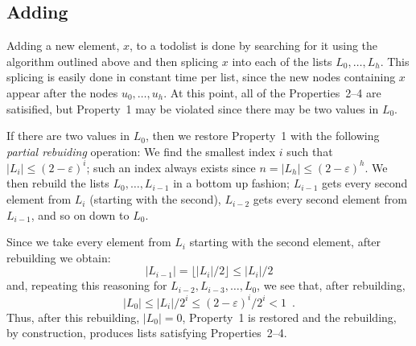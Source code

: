 \documentclass[12pt]{patmorin}
\newcommand{\eps}{\varepsilon}
\begin{document}
\vspace{1ex}
\begin{algorithmic}
    \ENDIF
  \ENDFOR
\end{algorithmic}

\subsection{Adding}

Adding a new element, $x$, to a todolist is done by searching for it
using the algorithm outlined above and then splicing $x$ into each of
the lists $L_0,\ldots,L_h$.  This splicing is easily done in constant
time per list, since the new nodes containing $x$ appear after the nodes
$u_0,\ldots,u_h$.  At this point, all of the Properties~2--4 are satisified,
but Property~1 may be violated since there may be two values in $L_0$.

If there are two values in $L_0$, then we restore Property~1 with the
following \emph{partial rebuiding} operation: We find the smallest index
$i$ such that $|L_i|\le (2-\eps)^i$; such an index always exists since
$n=|L_h|\le(2-\eps)^h$.  We then rebuild the lists $L_{0},\ldots,L_{i-1}$
in a bottom up fashion; $L_{i-1}$ gets every second element from $L_i$
(starting with the second), $L_{i-2}$ gets every second element from
$L_{i-1}$, and so on down to $L_0$.

Since we take every element from $L_i$ starting with the second element,
after rebuilding we obtain:
\[
   |L_{i-1}| = \lfloor |L_i|/2 \rfloor \le |L_i|/2
\]
and, repeating this reasoning for $L_{i-2}, L_{i-3},\ldots, L_0$, we see that, after rebuilding,
\[
   |L_{0}| \le |L_i|/2^i \le (2-\eps)^i/2^i < 1 \enspace .
\]
Thus, after this rebuilding, $|L_0|=0$, Property~1 is restored and the
rebuilding, by construction, produces lists satisfying Properties~2--4.
\end{document}
